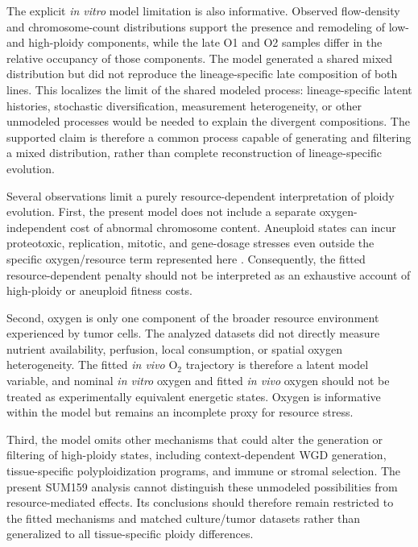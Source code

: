 \documentclass[11pt]{article}
\begin{document}
The explicit \textit{in vitro} model limitation is also informative. Observed flow-density and chromosome-count distributions support the presence and remodeling of low- and high-ploidy components, while the late O1 and O2 samples differ in the relative occupancy of those components. The model generated a shared mixed distribution but did not reproduce the lineage-specific late composition of both lines. This localizes the limit of the shared modeled process: lineage-specific latent histories, stochastic diversification, measurement heterogeneity, or other unmodeled processes would be needed to explain the divergent compositions. The supported claim is therefore a common process capable of generating and filtering a mixed distribution, rather than complete reconstruction of lineage-specific evolution.

Several observations limit a purely resource-dependent interpretation of ploidy evolution. First, the present model does not include a separate oxygen-independent cost of abnormal chromosome content. Aneuploid states can incur proteotoxic, replication, mitotic, and gene-dosage stresses even outside the specific oxygen/resource term represented here \cite{santaguida_chromosome_2017,sheltzer_single-chromosome_2017,kuznetsova_chromosomal_2015}. Consequently, the fitted resource-dependent penalty should not be interpreted as an exhaustive account of high-ploidy or aneuploid fitness costs.

Second, oxygen is only one component of the broader resource environment experienced by tumor cells. The analyzed datasets did not directly measure nutrient availability, perfusion, local consumption, or spatial oxygen heterogeneity. The fitted \textit{in vivo} O$_2$ trajectory is therefore a latent model variable, and nominal \textit{in vitro} oxygen and fitted \textit{in vivo} oxygen should not be treated as experimentally equivalent energetic states. Oxygen is informative within the model but remains an incomplete proxy for resource stress.

Third, the model omits other mechanisms that could alter the generation or filtering of high-ploidy states, including context-dependent WGD generation, tissue-specific polyploidization programs, and immune or stromal selection. The present SUM159 analysis cannot distinguish these unmodeled possibilities from resource-mediated effects. Its conclusions should therefore remain restricted to the fitted mechanisms and matched culture/tumor datasets rather than generalized to all tissue-specific ploidy differences.
\end{document}
